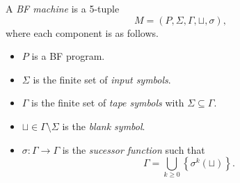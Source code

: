 \begin{definition}
  A \emph{BF machine} is a 5-tuple
  \begin{equation*}
    M = (P, \Sigma, \Gamma, \sqcup, \sigma),
  \end{equation*}
  where each component is as follows.
  \begin{itemize}
    \item $P$ is a BF program.
    \item $\Sigma$ is the finite set of \emph{input symbols}.
    \item $\Gamma$ is the finite set of \emph{tape symbols} with
    $\Sigma \subseteq \Gamma$.
    \item $\sqcup \in \Gamma \setminus \Sigma$ is the \emph{blank symbol}.
    \item $\sigma: \Gamma \to \Gamma$ is the \emph{sucessor function} such
    that
    \begin{equation*}
      \Gamma = \bigcup_{k \geq 0} \left\{\sigma^k(\sqcup)\right\}.
    \end{equation*}
  \end{itemize}
\end{definition}